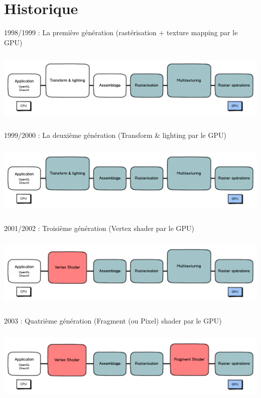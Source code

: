 \section{Historique}
1998/1999 : La première génération (rastérisation + texture mapping par le GPU)
\\
\begin{center}
\includegraphics[width=14cm,height=35mm]{pipeline/images/pipeline1.png}
\end{center}
1999/2000 : La deuxième génération (Transform \& lighting par le GPU)
\\
\begin{center}
\includegraphics[width=14cm,height=35mm]{pipeline/images/pipeline2.png} 
\end{center}
2001/2002 : Troisième génération (Vertex shader par le GPU)
\\
\begin{center}
\includegraphics[width=14cm,height=35mm]{pipeline/images/pipeline3.png}
\end{center}
2003 : Quatrième génération (Fragment (ou Pixel) shader par le GPU)
\\
\begin{center}
\includegraphics[width=14cm,height=35mm]{pipeline/images/pipeline4.png}
\end{center}

